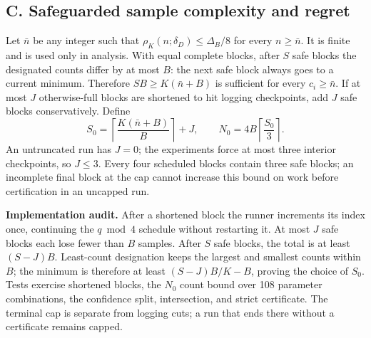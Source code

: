 \documentclass[11pt,a4paper]{article}
\begin{document}
\subsection{C. Safeguarded sample complexity and regret}
Let $\bar n$ be any integer such that $\rho_K(n;\delta_D)\le\Delta_B/8$ for every $n\ge\bar n$. It is finite and is used only in analysis. With equal complete blocks, after $S$ safe blocks the designated counts differ by at most $B$: the next safe block always goes to a current minimum. Therefore $S B\ge K(\bar n+B)$ is sufficient for every $c_i\ge\bar n$. If at most $J$ otherwise-full blocks are shortened to hit logging checkpoints, add $J$ safe blocks conservatively. Define
\begin{equation}\label{eq:N0}
S_0=\left\lceil\frac{K(\bar n+B)}B\right\rceil+J,\qquad
N_0=4B\left\lceil\frac{S_0}{3}\right\rceil.
\end{equation}
An untruncated run has $J=0$; the experiments force at most three interior checkpoints, so $J\le3$. Every four scheduled blocks contain three safe blocks; an incomplete final block at the cap cannot increase this bound on work before certification in an uncapped run.

\textbf{Implementation audit.} After a shortened block the runner increments its index once, continuing the $q\bmod4$ schedule without restarting it. At most $J$ safe blocks each lose fewer than $B$ samples. After $S$ safe blocks, the total is at least $(S-J)B$. Least-count designation keeps the largest and smallest counts within $B$; the minimum is therefore at least $(S-J)B/K-B$, proving the choice of $S_0$. Tests exercise shortened blocks, the $N_0$ count bound over 108 parameter combinations, the confidence split, intersection, and strict certificate. The terminal cap is separate from logging cuts; a run that ends there without a certificate remains capped.
\end{document}
